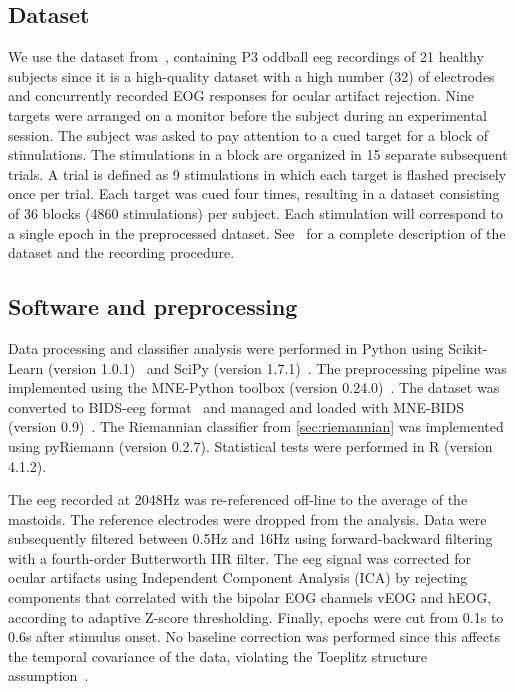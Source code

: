	\subsection{Dataset}
	We use the dataset from~\textcite{Wittevrongel2016}, containing P3 oddball \ac{eeg}
	recordings of 21 healthy subjects since it is a high-quality dataset with a high
	number (32) of electrodes and concurrently recorded EOG responses for ocular artifact rejection.
	Nine targets were arranged on a monitor before the subject during an
	experimental session.
	The subject was asked to pay attention to a cued target for a block
	of stimulations.
	The stimulations in a block are organized in 15 separate subsequent trials.
	A trial is defined as 9 stimulations in which each target is flashed
	precisely once per trial.
	Each target was cued four times, resulting in a dataset consisting of 36 blocks
	(4860 stimulations) per subject.
	Each stimulation will correspond to a single epoch in the preprocessed dataset.
	See~\textcite{Wittevrongel2016} for a complete description of the dataset and the recording procedure.

	\subsection{Software and preprocessing}
	Data processing and classifier analysis were performed in Python using
	Scikit-Learn (version 1.0.1)~\cite{Pedregosa2011} and SciPy (version
	1.7.1)~\cite{Virtanen2020}.
	The preprocessing pipeline was implemented using the MNE-Python toolbox
	(version 0.24.0)~\cite{Gramfort2013}.
	The dataset was converted to BIDS-\ac{eeg} format~\cite{Pernet2019} and managed and
	loaded with MNE-BIDS (version 0.9)~\cite{Appelhoff2019}.
	The Riemannian classifier from \cref{sec:riemannian} was implemented using
	pyRiemann (version 0.2.7).
	Statistical tests were performed in R (version 4.1.2).

	The \ac{eeg} recorded at 2048Hz was re-referenced off-line to the average of the mastoids.
	The reference electrodes were dropped from the analysis.
	Data were subsequently filtered between 0.5Hz and 16Hz using forward-backward
	filtering with a fourth-order Butterworth IIR filter.
	The \ac{eeg} signal was corrected for ocular artifacts using Independent Component
	Analysis (ICA) by rejecting components that correlated with the bipolar EOG channels vEOG and hEOG, according to adaptive Z-score thresholding.
	Finally, epochs were cut from 0.1s to 0.6s after stimulus onset.
	No baseline correction was performed since this affects the temporal covariance
	of the data, violating the Toeplitz structure assumption~\cite{Bijma2003}.

